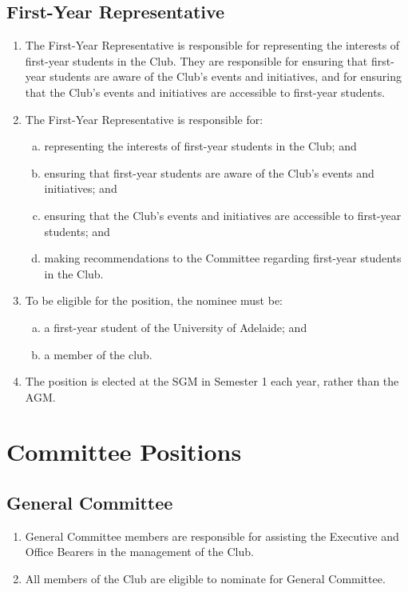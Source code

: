 \documentclass{schedule}
\begin{document}
\subsection{First-Year Representative}
\begin{enumerate}[(1)]
    \item The First-Year Representative is responsible for representing the interests of first-year students in the Club. They are responsible for ensuring that first-year students are aware of the Club's events and initiatives, and for ensuring that the Club's events and initiatives are accessible to first-year students.
    \item The First-Year Representative is responsible for:
          \begin{enumerate}[(a)]
              \item representing the interests of first-year students in the Club; and
              \item ensuring that first-year students are aware of the Club's events and initiatives; and
              \item ensuring that the Club's events and initiatives are accessible to first-year students; and
              \item making recommendations to the Committee regarding first-year students in the Club.
          \end{enumerate}
    \item To be eligible for the position, the nominee must be:
          \begin{enumerate}[(a)]
              \item a first-year student of the University of Adelaide; and
              \item a member of the club.
          \end{enumerate}
    \item The position is elected at the SGM in Semester 1 each year, rather than the AGM.
\end{enumerate}

\section{Committee Positions}

\subsection{General Committee}
\begin{enumerate}[(1)]
    \item General Committee members are responsible for assisting the Executive and Office Bearers in the management of the Club.
    \item All members of the Club are eligible to nominate for General Committee.
\end{enumerate}
\end{document}

